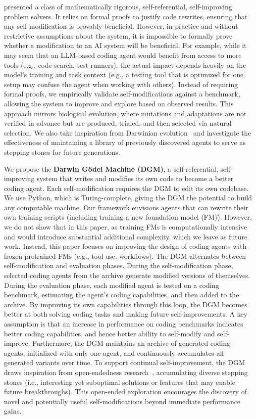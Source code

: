 \citet{schmidhuber2007godel} presented a class of mathematically rigorous, self-referential, self-improving problem solvers. It relies on formal proofs to justify code rewrites, ensuring that any self-modification is provably beneficial. However, in practice and without restrictive assumptions about the system, it is impossible to formally prove whether a modification to an AI system will be beneficial. For example, while it may seem that an LLM-based coding agent would benefit from access to more tools (e.g., code search, test runners), the actual impact depends heavily on the model’s training and task context (e.g., a testing tool that is optimized for one setup may confuse the agent when working with others). Instead of requiring formal proofs, we empirically validate self-modifications against a benchmark, allowing the system to improve and explore based on observed results. This approach mirrors biological evolution, where mutations and adaptations are not verified in advance but are produced, trialed, and then selected via natural selection. We also take inspiration from Darwinian evolution~\citep{darwin2023origin} and investigate the effectiveness of maintaining a library of previously discovered agents to serve as stepping stones for future generations.

We propose the \textbf{Darwin G\"odel Machine (DGM)}, a self-referential, self-improving system that writes and modifies its own code to become a better coding agent. Each self-modification requires the DGM to edit its own codebase. We use Python, which is Turing-complete, giving the DGM the potential to build any computable machine. Our framework envisions agents that can rewrite their own training scripts (including training a new foundation model (FM)). However, we do not show that in this paper, as training FMs is computationally intensive and would introduce substantial additional complexity, which we leave as future work. Instead, this paper focuses on improving the design of coding agents with frozen pretrained FMs (e.g., tool use, workflows). The DGM alternates between self-modification and evaluation phases. During the self-modification phase, selected coding agents from the archive generate modified versions of themselves. During the evaluation phase, each modified agent is tested on a coding benchmark, estimating the agent's coding capabilities, and then added to the archive. By improving its own capabilities through this loop, the DGM becomes better at both solving coding tasks and making future self-improvements. A key assumption is that an increase in performance on coding benchmarks indicates better coding capabilities, and hence better ability to self-modify and self-improve. Furthermore, the DGM maintains an archive of generated coding agents, initialized with only one agent, and continuously accumulates all generated variants over time. To support continual self-improvement, the DGM draws inspiration from open-endedness research~\citep{wang2019paired, fernandopromptbreeder, faldor2025omni}, accumulating diverse stepping stones (i.e., interesting yet suboptimal solutions or features that may enable future breakthroughs). This open-ended exploration encourages the discovery of novel and potentially useful self-modifications beyond immediate performance gains.

